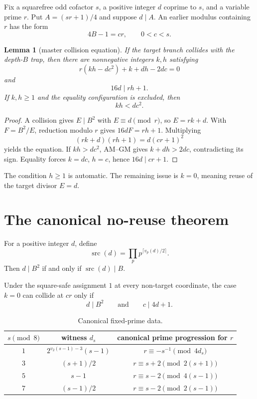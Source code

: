 \documentclass[11pt]{article}
\newtheorem{lemma}[theorem]{Lemma}
\theoremstyle{definition}
\newcommand{\src}{\operatorname{src}}
\begin{document}
Fix a squarefree odd cofactor $s$, a positive integer $d$ coprime to $s$, and a variable prime $r$. Put $A=(sr+1)/4$ and suppose $d\mid A$. An earlier modulus containing $r$ has the form
\[
4B-1=cr,\qquad 0<c<s.
\]

\begin{lemma}[master collision equation]\label{lem:master}
If the target branch collides with the depth-$B$ trap, then there are nonnegative integers $k,h$ satisfying
\[
\boxed{r(kh-dc^2)+k+dh-2dc=0}
\]
and
\[
16d\mid rh+1.
\]
If $k,h\ge1$ and the equality configuration is excluded, then
\[
\boxed{kh<dc^2.}
\]
\end{lemma}

\begin{proof}
A collision gives $E\mid B^2$ with $E\equiv d\pmod r$, so $E=rk+d$. With $F=B^2/E$, reduction modulo $r$ gives $16dF=rh+1$. Multiplying
\[
(rk+d)(rh+1)=d(cr+1)^2
\]
yields the equation. If $kh>dc^2$, AM--GM gives $k+dh>2dc$, contradicting its sign. Equality forces $k=dc$, $h=c$, hence $16d\mid cr+1$.
\end{proof}

The condition $h\ge1$ is automatic. The remaining issue is $k=0$, meaning reuse of the target divisor $E=d$.

\section{The canonical no-reuse theorem}
For a positive integer $d$, define
\[
\src(d)=\prod_p p^{\lceil v_p(d)/2\rceil}.
\]
Then $d\mid B^2$ if and only if $\src(d)\mid B$.

Under the square-safe assignment $1$ at every non-target coordinate, the case $k=0$ can collide at $cr$ only if
\[
\boxed{d\mid B^2\qquad\text{and}\qquad c\mid4d+1.}
\]

\begin{table}[h]
\centering
\begin{tabular}{c|c|c}
$s\pmod8$ & witness $d_s$ & canonical prime progression for $r$ \\
\hline
$1$ & $2^{v_2(s-1)-3}(s-1)$ & $r\equiv-s^{-1}\pmod{4d_s}$ \\
$3$ & $(s+1)/2$ & $r\equiv s+2\pmod{2(s+1)}$ \\
$5$ & $s-1$ & $r\equiv s-2\pmod{4(s-1)}$ \\
$7$ & $(s-1)/2$ & $r\equiv s-2\pmod{2(s-1)}$
\end{tabular}
\caption{Canonical fixed-prime data.}
\label{tab:canonical}
\end{table}
\end{document}
